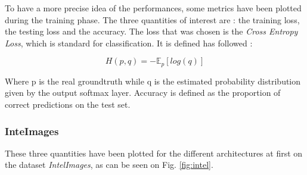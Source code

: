\documentclass[twocolumn,superscriptaddress,aps]{revtex4-1}
\begin{document}
To have a more precise idea of the performances, some metrics have been plotted during the training phase. The three quantities of interest are : the training loss, the testing loss and the accuracy. The loss that was chosen is the \textit{Cross Entropy Loss}, which is standard for classification. It is defined has followed : 

$$
H(p,q) = -\mathbb{E}_p [log(q)]
$$

Where p is the real groundtruth while q is the estimated probability distribution given by the output softmax layer. Accuracy is defined as the proportion of correct predictions on the test set. \\


\subsubsection{InteImages}

These three quantities have been plotted for the different architectures at first on the dataset \textit{IntelImages}, as can be seen on Fig. \ref{fig:intel}. 
\end{document}
